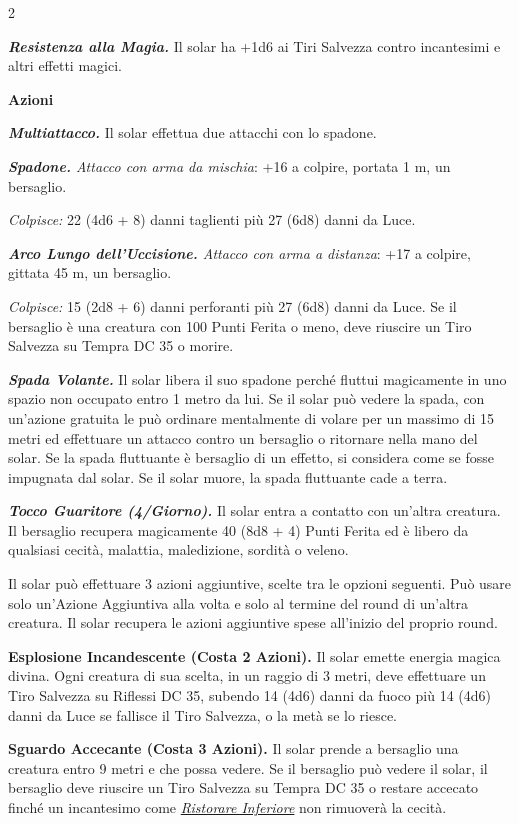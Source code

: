 \begin{multicols}{2}
{\emph{\textbf{Resistenza alla Magia.}} Il solar ha +1d6 ai Tiri Salvezza contro incantesimi e altri effetti magici.

\textbf{Azioni}

\emph{\textbf{Multiattacco.}} Il solar effettua due attacchi con lo spadone.

\emph{\textbf{Spadone.} Attacco con arma da mischia}: +16 a colpire, portata 1 m, un bersaglio.

\emph{Colpisce:} 22 (4d6 + 8) danni taglienti più 27 (6d8) danni da Luce.

\emph{\textbf{Arco Lungo dell'Uccisione.} Attacco con arma a distanza}: +17 a colpire, gittata 45 m, un bersaglio.

\emph{Colpisce:} 15 (2d8 + 6) danni perforanti più 27 (6d8) danni da Luce. Se il bersaglio è una creatura con 100 Punti Ferita o meno, deve riuscire un Tiro Salvezza su Tempra DC 35 o morire.

\emph{\textbf{Spada Volante.}} Il solar libera il suo spadone perché fluttui magicamente in uno spazio non occupato entro 1 metro da lui. Se il solar può vedere la spada, con un'azione gratuita le può ordinare mentalmente di volare per un massimo di 15 metri ed effettuare un attacco contro un bersaglio o ritornare nella mano del solar. Se la spada fluttuante è bersaglio di un effetto, si considera come se fosse impugnata dal solar. Se il solar muore, la spada fluttuante cade a terra.

\emph{\textbf{Tocco Guaritore (4/Giorno).}} Il solar entra a contatto con un'altra creatura. Il bersaglio recupera magicamente 40 (8d8 + 4) Punti Ferita ed è libero da qualsiasi cecità, malattia, maledizione, sordità o veleno.

Il solar può effettuare 3 azioni aggiuntive, scelte tra le opzioni seguenti. Può usare solo un'Azione Aggiuntiva alla volta e solo al termine del round di un'altra creatura. Il solar recupera le azioni aggiuntive spese all'inizio del proprio round.

\textbf{Esplosione Incandescente (Costa 2 Azioni).} Il solar emette energia magica divina. Ogni creatura di sua scelta, in un raggio di 3 metri, deve effettuare un Tiro Salvezza su Riflessi DC 35, subendo 14 (4d6) danni da fuoco più 14 (4d6) danni da Luce se fallisce il Tiro Salvezza, o la metà se lo riesce.

\textbf{Sguardo Accecante (Costa 3 Azioni).} Il solar prende a bersaglio una creatura entro 9 metri e che possa vedere. Se il bersaglio può vedere il solar, il bersaglio deve riuscire un Tiro Salvezza su Tempra DC 35 o restare accecato finché un incantesimo come \emph{\hyperlink{Ristorare Inferiore}{Ristorare Inferiore}} non rimuoverà la cecità.

}
\end{multicols}
